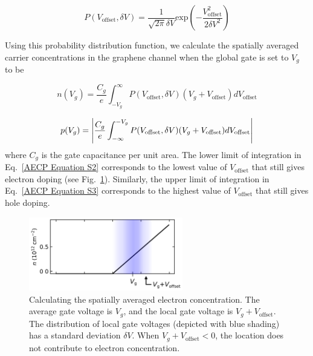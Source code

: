 \documentclass[double,12pt,1in,seploa]{beavtex}
\begin{document}
\begin{equation}
    P(V_{\mathrm{offset}}, \delta V) = \frac{1}{\sqrt{2 \pi}\delta V}\mathrm{exp}\left(-\frac{V_{\mathrm{offset}}^2}{2\delta V^2}\right)
    \label{AECP Equation S1}
\end{equation}

Using this probability distribution function, we calculate the spatially averaged carrier concentrations in the graphene channel when the global gate is set to $V_g$ to be


\begin{equation}
    n(V_g) = \frac{C_g}{e}\int_{-V_g}^{\infty}P(V_{\mathrm{offset}}, \delta V)(V_g + V_{\mathrm{offset}})dV_{\mathrm{offset}}
    \label{AECP Equation S2}
\end{equation}

\begin{equation}
    p(V_g) = \abs{\frac{C_g}{e}\int_{-\infty}^{-V_g}P(V_{\mathrm{offset}}, \delta V)(V_g + V_{\mathrm{offset}})dV_{\mathrm{offset}}}
    \label{AECP Equation S3}
\end{equation}
where $C_g$ is the gate capacitance per unit area. The lower limit of integration in Eq.\ \ref{AECP Equation S2} corresponds to the lowest value of $V_{\mathrm{offset}}$ that still gives electron doping (see Fig.\ \ref{AECP Figure S2}). Similarly, the upper limit of integration in Eq.\ \ref{AECP Equation S3} corresponds to the highest value of $V_{\mathrm{offset}}$ that still gives hole doping.

\begin{figure}
    \includegraphics[width = 0.6\textwidth]{Figure S2, V_offset.png}
    \caption{Calculating the spatially averaged electron concentration. The average gate voltage is $V_g$, and the local gate voltage is $V_g + V_{\mathrm{offset}}$. The distribution of local gate voltages (depicted with blue shading) has a standard deviation $\delta V$. When $V_g + V_{\mathrm{offset}} < 0$, the location does not contribute to electron concentration.}
    \label{AECP Figure S2}
\end{figure}
\end{document}
